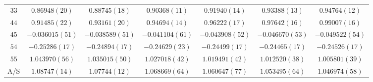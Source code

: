 \begin{table}
\begin{center}
\begin{tabular}{c|c c c c c c}
$33$ & $0.86948(20)$ & $0.88745(18)$ & $0.90368(11)$ & $0.91940(14)$ & $0.93388(13)$ & $0.94764(12)$ \\
$44$ & $0.91485(22)$ & $0.93161(20)$ & $0.94694(14)$ & $0.96222(17)$ & $0.97642(16)$ & $0.99007(16)$ \\
$45$ & $-0.036015(51)$ & $-0.038589(51)$ & $-0.041104(61)$ & $-0.043908(52)$ & $-0.046670(53)$ & $-0.049522(54)$ \\
$54$ & $-0.25286(17)$ & $-0.24894(17)$ & $-0.24629(23)$ & $-0.24499(17)$ & $-0.24465(17)$ & $-0.24526(17)$ \\
$55$ & $1.043970(56)$ & $1.035015(50)$ & $1.027018(42)$ & $1.019491(42)$ & $1.012520(38)$ & $1.005801(39)$ \\
\hline
A/S & $1.08747(14)$ & $1.07744(12)$ & $1.068669(64)$ & $1.060647(77)$ & $1.053495(64)$ & $1.046974(58)$ \\
\hline
\hline
\end{tabular}
\end{center}
\end{table}